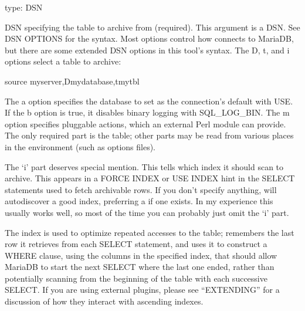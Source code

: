 \documentclass[letterpaper,10pt,english]{sphinxmanual}
\begin{document}
\begin{fulllineitems}
\label{\detokenize{mariadb-archiver:cmdoption-mariadb-archiver-source}}
\sphinxAtStartPar
type: DSN

\sphinxAtStartPar
DSN specifying the table to archive from (required).  This argument is a DSN.
See DSN OPTIONS for the syntax.  Most options control how 
connects to MariaDB, but there are some extended DSN options in this tool’s
syntax.  The D, t, and i options select a table to archive:

\begin{sphinxVerbatim}[commandchars=\\\{\}]
\PYGZhy{}\PYGZhy{}source my\PYGZus{}server,Dmy\PYGZus{}database,tmy\PYGZus{}tbl
\end{sphinxVerbatim}

\sphinxAtStartPar
The a option specifies the database to set as the connection’s default with USE.
If the b option is true, it disables binary logging with SQL\_LOG\_BIN.  The m
option specifies pluggable actions, which an external Perl module can provide.
The only required part is the table; other parts may be read from various
places in the environment (such as options files).

\sphinxAtStartPar
The ‘i’ part deserves special mention.  This tells  which index
it should scan to archive.  This appears in a FORCE INDEX or USE INDEX hint in
the SELECT statements used to fetch archivable rows.  If you don’t specify
anything,  will auto\sphinxhyphen{}discover a good index, preferring a  if one exists.  In my experience this usually works well, so most of the
time you can probably just omit the ‘i’ part.

\sphinxAtStartPar
The index is used to optimize repeated accesses to the table; 
remembers the last row it retrieves from each SELECT statement, and uses it to
construct a WHERE clause, using the columns in the specified index, that should
allow MariaDB to start the next SELECT where the last one ended, rather than
potentially scanning from the beginning of the table with each successive
SELECT.  If you are using external plugins, please see “EXTENDING” for a
discussion of how they interact with ascending indexes.


\end{fulllineitems}
\end{document}
